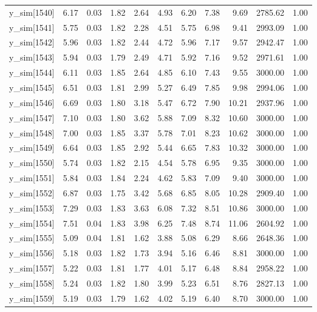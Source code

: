 \begin{table}[ht]
\begin{tabular}{rrrrrrrrrrr}
  y\_sim[1540] & 6.17 & 0.03 & 1.82 & 2.64 & 4.93 & 6.20 & 7.38 & 9.69 & 2785.62 & 1.00 \\ 
  y\_sim[1541] & 5.75 & 0.03 & 1.82 & 2.28 & 4.51 & 5.75 & 6.98 & 9.41 & 2993.09 & 1.00 \\ 
  y\_sim[1542] & 5.96 & 0.03 & 1.82 & 2.44 & 4.72 & 5.96 & 7.17 & 9.57 & 2942.47 & 1.00 \\ 
  y\_sim[1543] & 5.94 & 0.03 & 1.79 & 2.49 & 4.71 & 5.92 & 7.16 & 9.52 & 2971.61 & 1.00 \\ 
  y\_sim[1544] & 6.11 & 0.03 & 1.85 & 2.64 & 4.85 & 6.10 & 7.43 & 9.55 & 3000.00 & 1.00 \\ 
  y\_sim[1545] & 6.51 & 0.03 & 1.81 & 2.99 & 5.27 & 6.49 & 7.85 & 9.98 & 2994.06 & 1.00 \\ 
  y\_sim[1546] & 6.69 & 0.03 & 1.80 & 3.18 & 5.47 & 6.72 & 7.90 & 10.21 & 2937.96 & 1.00 \\ 
  y\_sim[1547] & 7.10 & 0.03 & 1.80 & 3.62 & 5.88 & 7.09 & 8.32 & 10.60 & 3000.00 & 1.00 \\ 
  y\_sim[1548] & 7.00 & 0.03 & 1.85 & 3.37 & 5.78 & 7.01 & 8.23 & 10.62 & 3000.00 & 1.00 \\ 
  y\_sim[1549] & 6.64 & 0.03 & 1.85 & 2.92 & 5.44 & 6.65 & 7.83 & 10.32 & 3000.00 & 1.00 \\ 
  y\_sim[1550] & 5.74 & 0.03 & 1.82 & 2.15 & 4.54 & 5.78 & 6.95 & 9.35 & 3000.00 & 1.00 \\ 
  y\_sim[1551] & 5.84 & 0.03 & 1.84 & 2.24 & 4.62 & 5.83 & 7.09 & 9.40 & 3000.00 & 1.00 \\ 
  y\_sim[1552] & 6.87 & 0.03 & 1.75 & 3.42 & 5.68 & 6.85 & 8.05 & 10.28 & 2909.40 & 1.00 \\ 
  y\_sim[1553] & 7.29 & 0.03 & 1.83 & 3.63 & 6.08 & 7.32 & 8.51 & 10.86 & 3000.00 & 1.00 \\ 
  y\_sim[1554] & 7.51 & 0.04 & 1.83 & 3.98 & 6.25 & 7.48 & 8.74 & 11.06 & 2604.92 & 1.00 \\ 
  y\_sim[1555] & 5.09 & 0.04 & 1.81 & 1.62 & 3.88 & 5.08 & 6.29 & 8.66 & 2648.36 & 1.00 \\ 
  y\_sim[1556] & 5.18 & 0.03 & 1.82 & 1.73 & 3.94 & 5.16 & 6.46 & 8.81 & 3000.00 & 1.00 \\ 
  y\_sim[1557] & 5.22 & 0.03 & 1.81 & 1.77 & 4.01 & 5.17 & 6.48 & 8.84 & 2958.22 & 1.00 \\ 
  y\_sim[1558] & 5.24 & 0.03 & 1.82 & 1.80 & 3.99 & 5.23 & 6.51 & 8.76 & 2827.13 & 1.00 \\ 
  y\_sim[1559] & 5.19 & 0.03 & 1.79 & 1.62 & 4.02 & 5.19 & 6.40 & 8.70 & 3000.00 & 1.00 \\ 

\end{tabular}
\end{table}
